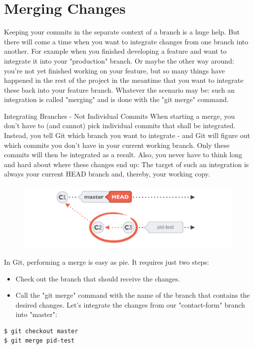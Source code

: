 \documentclass{article}
\begin{document}
\section{Merging Changes}
Keeping your commits in the separate context of a branch is a huge help. But there will come a time when you want to integrate changes from one branch into another. For example when you finished developing a feature and want to integrate it into your "production" branch. Or maybe the other way around: you're not yet finished working on your feature, but so many things have happened in the rest of the project in the meantime that you want to integrate these back into your feature branch.
\newline\newline
Whatever the scenario may be: such an integration is called "merging" and is done with the "git merge" command.
\begin{concept}
Integrating Branches - Not Individual Commits
\newline\newline
When starting a merge, you don't have to (and cannot) pick individual commits that shall be integrated. Instead, you tell Git which branch you want to integrate - and Git will figure out which commits you don't have in your current working branch. Only these commits will then be integrated as a result.
\newline\newline
Also, you never have to think long and hard about where these changes end up: The target of such an integration is always your current HEAD branch and, thereby, your working copy.
\begin{figure}[h]
    \centering
    \includegraphics[width=4.5in]{images/basic-merging.png}
\end{figure}
\end{concept}
In Git, performing a merge is easy as pie. It requires just two steps:
\begin{itemize}
    \item Check out the branch that should receive the changes.
    \item Call the "git merge" command with the name of the branch that contains the desired changes.
Let's integrate the changes from our "contact-form" branch into "master":
\end{itemize}
\begin{lstlisting}
$ git checkout master
$ git merge pid-test
\end{lstlisting}
\end{document}
